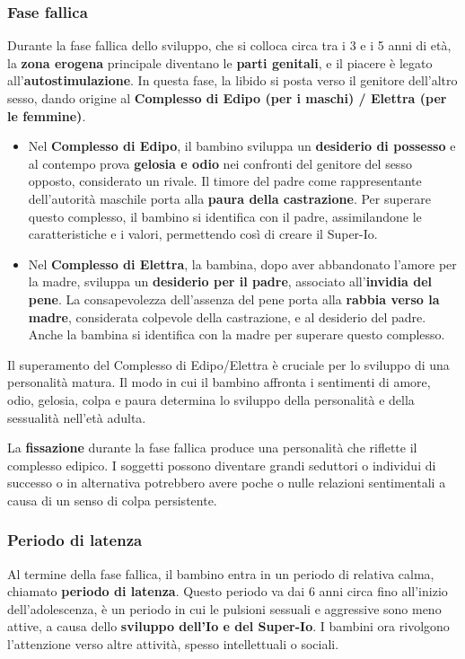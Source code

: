 \documentclass{subfiles}
\begin{document}
\subsubsection{Fase fallica}
Durante la fase fallica dello sviluppo, che si colloca circa tra i 3 e i 5 anni di età, la 
\textbf{zona erogena} principale diventano le \textbf{parti genitali}, e il piacere è legato 
all'\textbf{autostimulazione}. In questa fase, la libido si posta verso il genitore dell'altro 
sesso, dando origine al \textbf{Complesso di Edipo (per i maschi) / Elettra (per le femmine)}.

\begin{itemize}

    \item Nel \textbf{Complesso di Edipo}, il bambino sviluppa un \textbf{desiderio di possesso} 
    e al contempo prova \textbf{gelosia e odio} nei confronti del genitore del sesso opposto, 
    considerato un rivale. Il timore del padre come rappresentante dell'autorità maschile porta 
    alla \textbf{paura della castrazione}. Per superare questo complesso, il bambino si 
    identifica con il padre, assimilandone le caratteristiche e i valori, permettendo così 
    di creare il Super-Io.

   \item Nel \textbf{Complesso di Elettra}, la bambina, dopo aver abbandonato l'amore per 
   la madre, sviluppa un \textbf{desiderio per il padre}, associato all'\textbf{invidia del pene}. 
   La consapevolezza dell'assenza del pene porta alla \textbf{rabbia verso la madre}, considerata 
   colpevole della castrazione, e al desiderio del padre. Anche la bambina si identifica con la 
   madre per superare questo complesso.

\end{itemize}

Il superamento del Complesso di Edipo/Elettra è cruciale per lo sviluppo di una personalità matura. Il modo in cui il bambino affronta i sentimenti di amore, odio, gelosia, colpa e paura determina lo sviluppo della personalità e della sessualità nell'età adulta. 

La \textbf{fissazione} durante la fase fallica produce una personalità che riflette il 
complesso edipico. I soggetti possono diventare grandi seduttori o individui di successo o in 
alternativa potrebbero avere poche o nulle relazioni sentimentali a causa di un senso di 
colpa persistente. \\

\subsubsection{Periodo di latenza}
Al termine della fase fallica, il bambino entra in un periodo di relativa calma, chiamato 
\textbf{periodo di latenza}. Questo periodo va dai 6 anni circa fino all'inizio 
dell'adolescenza, è un periodo in cui le pulsioni sessuali e aggressive sono meno attive, 
a causa dello \textbf{sviluppo dell'Io e del Super-Io}.
I bambini ora rivolgono l'attenzione verso altre attività, spesso intellettuali o sociali.\\
\end{document}
